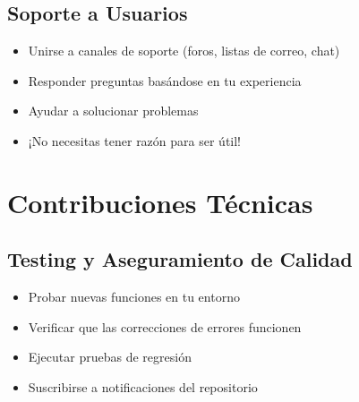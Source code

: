 \documentclass{presentacion}
\begin{document}
\subsection{Soporte a Usuarios}
\begin{frame}
    \begin{itemize}[<+->]
        \item Unirse a canales de soporte (foros, listas de correo, chat)
        \item Responder preguntas basándose en tu experiencia
        \item Ayudar a solucionar problemas
        \item ¡No necesitas tener razón para ser útil!
    \end{itemize}
    
    \vspace{1em}
\end{frame}

\section{Contribuciones Técnicas}

\subsection{Testing y Aseguramiento de Calidad}
\begin{frame}
    \begin{itemize}[<+->]
        \item Probar nuevas funciones en tu entorno
        \item Verificar que las correcciones de errores funcionen
        \item Ejecutar pruebas de regresión
        \item Suscribirse a notificaciones del repositorio
    \end{itemize}
    
    \vspace{1em}
\end{frame}
\end{document}
